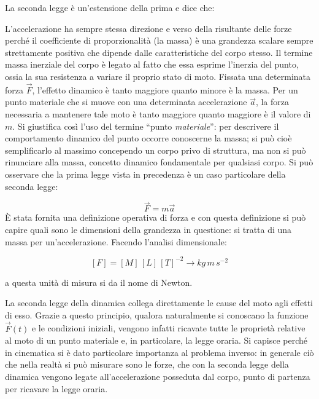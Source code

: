 La seconda legge è un'estensione della prima e dice che:

\noindent{}

L'accelerazione ha sempre stessa direzione e verso della risultante delle forze perché il coefficiente di proporzionalità (la massa) è una grandezza scalare sempre strettamente positiva che dipende dalle caratteristiche del corpo stesso. Il termine massa inerziale del corpo è legato al fatto che essa esprime l'inerzia del punto, ossia la sua resistenza a variare il proprio stato di moto. Fissata una determinata forza $\vec{F}$, l'effetto dinamico è tanto maggiore quanto minore è la massa. Per un punto materiale che si muove con una determinata accelerazione $\vec{a}$, la forza necessaria a mantenere tale moto è tanto maggiore quanto maggiore è il valore di $m$. Si giustifica così l'uso del termine “punto \emph{materiale}”: per descrivere il comportamento dinamico del punto occorre conoscerne la massa; si può cioè semplificarlo al massimo concependo un corpo privo di struttura, ma non si può rinunciare alla massa, concetto dinamico fondamentale per qualsiasi corpo.  Si può osservare che la prima legge vista in precedenza è un caso particolare della seconda legge:

\begin{equation}
	\vec{F}=m\vec{a}
\end{equation}
È stata fornita una definizione operativa di forza e con questa definizione si può capire quali sono le dimensioni della grandezza in questione: si tratta di una massa per un'accelerazione. Facendo l'analisi dimensionale:

\[
	[F]=[M]\,[L]\,[T]^{-2} \to kg\,m\,s^{-2}
\]

a questa unità di misura si da il nome di Newton.

La seconda legge della dinamica collega direttamente le cause del moto agli effetti di esso. Grazie a questo principio, qualora naturalmente si conoscano la funzione $\vec{F}(t)$ e le condizioni iniziali, vengono infatti ricavate tutte le proprietà relative al moto di un punto materiale e, in particolare, la legge oraria.  Si capisce perché in cinematica si è dato particolare importanza al problema inverso: in generale ciò che nella realtà si può misurare sono le forze, che con la seconda legge della dinamica vengono legate all'accelerazione posseduta dal corpo, punto di partenza per ricavare la legge oraria.

